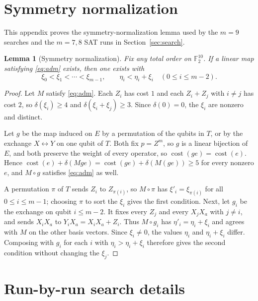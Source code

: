 \documentclass[11pt]{article}
\newtheorem{lemma}[theorem]{Lemma}
\theoremstyle{definition}
\theoremstyle{remark}
\newcommand{\F}{\mathbb F_2}
\newcommand{\cost}{\operatorname{cost}}
\begin{document}
\section{Symmetry normalization}\label{app:symmetry}

This appendix proves the symmetry-normalization lemma used by the
\(m=9\) searches and the \(m=7,8\) SAT runs in Section~\ref{sec:search}.

\begin{lemma}[Symmetry normalization]\label{lem:symmetry}
Fix any total order on \(\F^{10}\). If a linear map satisfying
\eqref{eq:adm} exists, then one exists with
\[
 \xi_0<\xi_1<\cdots<\xi_{m-1},\qquad
 \eta_i<\eta_i+\xi_i\quad(0\leq i\leq m-2).
\]
\end{lemma}
\begin{proof}
Let \(M\) satisfy \eqref{eq:adm}. Each \(Z_i\) has cost \(1\) and each
\(Z_i+Z_j\) with \(i\neq j\) has cost \(2\), so \(\delta(\xi_i)\geq4\)
and \(\delta(\xi_i+\xi_j)\geq3\). Since \(\delta(0)=0\), the \(\xi_i\)
are nonzero and distinct.

Let \(g\) be the map induced on \(E\) by a permutation of the qubits in
\(T\), or by the exchange \(X\leftrightarrow Y\) on one qubit of \(T\).
Both fix \(p=Z^m\), so \(g\) is a linear bijection of \(E\), and both
preserve the weight of every operator, so \(\cost(ge)=\cost(e)\). Hence
\(\cost(e)+\delta(Mge)=\cost(ge)+\delta(M(ge))\geq5\) for every nonzero
\(e\), and \(M\circ g\) satisfies \eqref{eq:adm} as well.

A permutation \(\pi\) of \(T\) sends \(Z_i\) to \(Z_{\pi(i)}\), so
\(M\circ\pi\) has \(\xi'_i=\xi_{\pi(i)}\) for all \(0\leq i\leq m-1\);
choosing \(\pi\) to sort the \(\xi_i\) gives the first condition. Next,
let \(g_i\) be the exchange on qubit \(i\leq m-2\). It fixes every
\(Z_j\) and every \(X_jX_a\) with \(j\neq i\), and sends \(X_iX_a\) to
\(Y_iX_a=X_iX_a+Z_i\). Thus \(M\circ g_i\) has \(\eta'_i=\eta_i+\xi_i\)
and agrees with \(M\) on the other basis vectors. Since \(\xi_i\neq0\),
the values \(\eta_i\) and \(\eta_i+\xi_i\) differ. Composing with
\(g_i\) for each \(i\) with \(\eta_i>\eta_i+\xi_i\) therefore gives the
second condition without changing the \(\xi_j\).
\end{proof}

\section{Run-by-run search details}\label{app:search}
\end{document}
